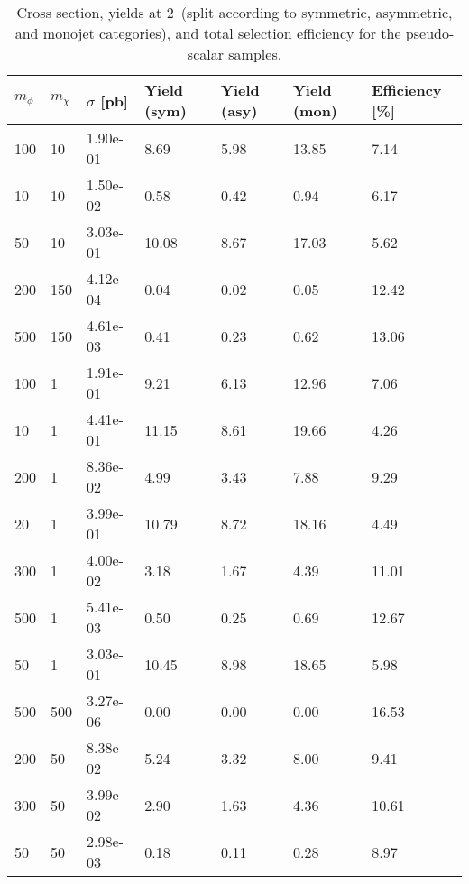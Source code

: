 \begin{table}
\small
\centering
\begin{tabular}{lllllll}
\hline
$m_\phi$ & $m_\chi$ & $\sigma$ [pb] & Yield (sym) & Yield (asy) & Yield (mon) & Efficiency [\%] \\ \hline
100       &   10        &   1.90e-01  &   8.69      &   5.98      &   13.85     &   7.14      \\ 
10        &   10        &   1.50e-02  &   0.58      &   0.42      &   0.94      &   6.17      \\ 
50        &   10        &   3.03e-01  &   10.08     &   8.67      &   17.03     &   5.62      \\ 
200       &   150       &   4.12e-04  &   0.04      &   0.02      &   0.05      &   12.42     \\ 
500       &   150       &   4.61e-03  &   0.41      &   0.23      &   0.62      &   13.06     \\ 
100       &   1         &   1.91e-01  &   9.21      &   6.13      &   12.96     &   7.06      \\ 
10        &   1         &   4.41e-01  &   11.15     &   8.61      &   19.66     &   4.26      \\ 
200       &   1         &   8.36e-02  &   4.99      &   3.43      &   7.88      &   9.29      \\ 
20        &   1         &   3.99e-01  &   10.79     &   8.72      &   18.16     &   4.49      \\ 
300       &   1         &   4.00e-02  &   3.18      &   1.67      &   4.39      &   11.01     \\ 
500       &   1         &   5.41e-03  &   0.50      &   0.25      &   0.69      &   12.67     \\ 
50        &   1         &   3.03e-01  &   10.45     &   8.98      &   18.65     &   5.98      \\ 
500       &   500       &   3.27e-06  &   0.00      &   0.00      &   0.00      &   16.53     \\ 
200       &   50        &   8.38e-02  &   5.24      &   3.32      &   8.00      &   9.41      \\ 
300       &   50        &   3.99e-02  &   2.90      &   1.63      &   4.36      &   10.61     \\ 
50        &   50        &   2.98e-03  &   0.18      &   0.11      &   0.28      &   8.97      \\ 
\hline
\end{tabular}
\caption{Cross section, yields at 2~\ifb (split according to symmetric, asymmetric, and monojet categories), and total selection efficiency for the pseudo-scalar \DMtt samples.}
\label{tab:dm_DMttP_g1_2fb}
\end{table}
